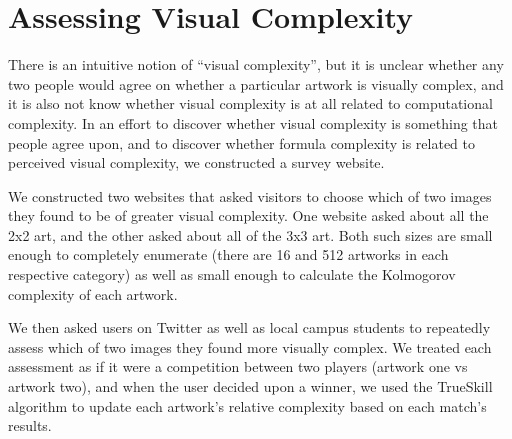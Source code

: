 \section{Assessing Visual Complexity}

There is an intuitive notion of ``visual complexity'', but it is unclear
whether any two people would agree on whether a particular artwork is visually
complex, and it is also not know whether visual complexity is at all related to
computational complexity.  In an effort to discover whether visual complexity
is something that people agree upon, and to discover whether formula complexity
is related to perceived visual complexity, we constructed a survey website.

We constructed two websites that asked visitors to choose which of two images
they found to be of greater visual complexity.  One website asked about all the
2x2 art, and the other asked about all of the 3x3 art.  Both such sizes are
small enough to completely enumerate (there are 16 and 512 artworks in each
respective category) as well as small enough to calculate the Kolmogorov
complexity of each artwork.

We then asked users on Twitter as well as local campus students to repeatedly
assess which of two images they found more visually complex.  We treated each
assessment as if it were a competition between two players (artwork one vs
artwork two), and when the user decided upon a winner, we used the TrueSkill
algorithm to update each artwork's relative complexity based on each match's
results.
